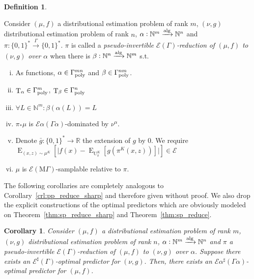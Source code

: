 \documentclass{article}
\numberwithin{equation}{section}
\theoremstyle{definition}
\newtheorem{definition}{Definition}[section]
\theoremstyle{plain}
\newtheorem{corollary}{Corollary}[section]
\newcommand{\Bool}{\{0,1\}}
\newcommand{\Words}{{\Bool^*}}
\DeclareMathOperator{\E}{E}
\DeclareMathOperator{\T}{T}
\DeclareMathOperator{\Un}{U}
\newcommand{\Nats}{\mathbb{N}}
\newcommand{\Reals}{\mathbb{R}}
\newcommand{\Abs}[1]{\lvert #1 \rvert}
\newcommand{\MGrow}{\mathrm{M}\Gamma}
\newcommand{\Fall}{\mathcal{E}}
\newcommand{\EG}{\Fall(\Gamma)}
\newcommand{\ESG}{\Fall^\sharp(\Gamma)}
\newcommand{\EMG}{\Fall(\MGrow)}
\newcommand{\Alg}{\xrightarrow{\textnormal{alg}}}
\newcommand{\Scheme}{\xrightarrow{\Gamma}}
\begin{document}
\begin{samepage}
\begin{definition}
\label{def:p_reduce}

Consider $(\mu,f)$ a distributional estimation problem of rank ${m}$, $(\nu,g)$ distributional estimation problem of rank ${n}$, ${\alpha: \Nats^m \Alg \Nats^n}$ and ${\pi: \Words \Scheme \Words}$. $\pi$ is called a \emph{pseudo-invertible $\EG$-reduction of $(\mu,f)$ to $(\nu,g)$ over ${\alpha}$} when there is ${\beta: \Nats^n \Alg \Nats^m}$ s.t.

\begin{enumerate}[(i)]

\item\label{con:def__p_reduce__pol_deg} As functions, ${\alpha \in \Gamma_{\textnormal{poly}}^{mn}}$ and ${\beta \in \Gamma_{\textnormal{poly}}^{nm}}$.

\item\label{con:def__p_reduce__eff_deg} ${\T_\alpha \in \Gamma_{\textnormal{poly}}^m}$, ${\T_\beta \in \Gamma_{\textnormal{poly}}^n}$

\item\label{con:def__p_reduce__inv_deg} $\forall L \in \Nats^m: \beta(\alpha(L))=L$

\item\label{con:def__p_reduce__dist} ${\pi_*\mu}$ is ${\Fall \alpha(\Gamma \alpha)}$-dominated by ${\nu^\alpha}$.

\item\label{con:def__p_reduce__fun} Denote ${\bar{g}: \Words \rightarrow \Reals}$ the extension of $g$ by 0. We require $\E_{(x,z) \sim \mu^{K}}[\Abs{f(x)-\E_{\Un_\pi^{K}}[g(\pi^{K}(x,z))]}] \in \Fall$

\item\label{con:def__p_reduce__smp} $\mu$ is $\EMG$-samplable relative to $\pi$.

\end{enumerate}

\end{definition}
\end{samepage}

The following corollaries are completely analogous to Corollary~\ref{crl:pp_reduce_sharp} and therefore given without proof. We also drop the explicit constructions of the optimal predictors which are obviously modeled on Theorem~\ref{thm:sp_reduce_sharp} and Theorem~\ref{thm:sp_reduce}.

\begin{samepage}
\begin{corollary}

Consider $(\mu,f)$ a distributional estimation problem of rank ${m}$, $(\nu,g)$ distributional estimation problem of rank ${n}$, ${\alpha: \Nats^m \Alg \Nats^n}$ and $\pi$ a pseudo-invertible $\EG$-reduction of $(\mu, f)$ to $(\nu, g)$ over ${\alpha}$. Suppose there exists an $\ESG$-optimal predictor for $(\nu, g)$. Then, there exists an $\Fall \alpha^\sharp (\Gamma \alpha)$-optimal predictor for $(\mu, f)$.

\end{corollary}
\end{samepage}
\end{document}
